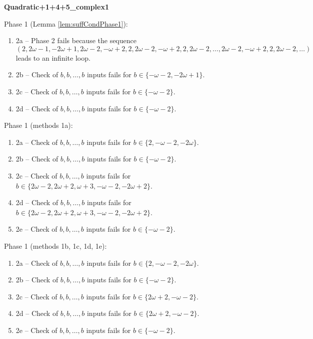 \begin{exmp}
\label{ex:compareAP}

\textbf{Quadratic+1+4+5\_complex1}

Phase 1 (Lemma \ref{lem:suffCondPhase1}):
\begin{enumerate}[ ]
\item  2a -- Phase 2   fails because  the sequence $(2, 2\omega - 1, -2\omega + 1, 2\omega - 2, -\omega + 2, 2, 2\omega - 2, -\omega + 2, 2, 2\omega - 2, \dots ,2\omega - 2, -\omega + 2, 2, 2\omega - 2, \dots)$ leads to an infinite loop.
\item  2b -- Check of $b,b,\dots,b$ inputs fails for $b\in \{-\omega - 2, -2\omega + 1\}$.
\item  2c -- Check of $b,b,\dots,b$ inputs fails for $b\in \{-\omega - 2\}$.
\item  2d -- Check of $b,b,\dots,b$ inputs fails for $b\in \{-\omega - 2\}$.
\end{enumerate}


Phase 1 (methods 1a):
\begin{enumerate}[ ]
\item  2a -- Check of $b,b,\dots,b$ inputs fails for $b\in \{2, -\omega - 2, -2\omega\}$.
\item  2b -- Check of $b,b,\dots,b$ inputs fails for $b\in \{-\omega - 2\}$.
\item  2c -- Check of $b,b,\dots,b$ inputs fails for $b\in \{2\omega - 2, 2\omega + 2, \omega + 3, -\omega - 2, -2\omega + 2\}$.
\item  2d -- Check of $b,b,\dots,b$ inputs fails for $b\in \{2\omega - 2, 2\omega + 2, \omega + 3, -\omega - 2, -2\omega + 2\}$.
\item  2e -- Check of $b,b,\dots,b$ inputs fails for $b\in \{-\omega - 2\}$.
\end{enumerate}


Phase 1 (methods 1b, 1c, 1d, 1e):
\begin{enumerate}[ ]
\item  2a -- Check of $b,b,\dots,b$ inputs fails for $b\in \{2, -\omega - 2, -2\omega\}$.
\item  2b -- Check of $b,b,\dots,b$ inputs fails for $b\in \{-\omega - 2\}$.
\item  2c -- Check of $b,b,\dots,b$ inputs fails for $b\in \{2\omega + 2, -\omega - 2\}$.
\item  2d -- Check of $b,b,\dots,b$ inputs fails for $b\in \{2\omega + 2, -\omega - 2\}$.
\item  2e -- Check of $b,b,\dots,b$ inputs fails for $b\in \{-\omega - 2\}$.
\end{enumerate}


\end{exmp}





